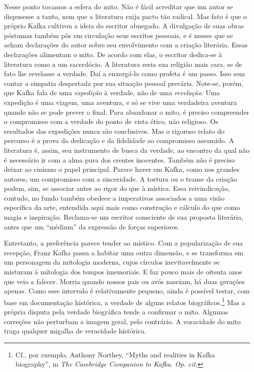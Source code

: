 Nesse ponto tocamos a esfera do mito. Não é fácil acreditar que um autor
se dispusesse a tanto, nem que a literatura exija pacto tão radical.
Mas fato é que o próprio Kafka cultivou a ideia do escritor abnegado. A
divulgação de suas obras póstumas também pôs em circulação seus
escritos pessoais, e é nesses que se acham declarações do autor sobre
seu envolvimento com a criação literária. Essas declarações alimentam o
mito. De acordo com elas, o escritor dedica-se à literatura como a um
sacerdócio. A literatura seria sua religião mais cara, se de fato lhe
revelasse a verdade. Daí a enxergá-lo como profeta é um passo. Isso
sem contar a simpatia despertada por sua situação pessoal precária.
Note-se, porém, que Kafka fala de uma \textit{expedição} à verdade,
não de uma \textit{revelação}. Uma expedição é uma viagem, uma
aventura, e só se vive uma verdadeira aventura quando não se pode
prever o final. Para abandonar o mito, é preciso compreender o
compromisso com a verdade do ponto de vista ético, não religioso. Os
resultados das expedições nunca são conclusivos. Mas o rigoroso relato
do percurso é a prova da dedicação e da fidelidade ao compromisso
assumido. A literatura é, assim, seu instrumento de busca da verdade,
ao encontro da qual não é necessário ir com a alma pura dos crentes
inocentes. Também não é preciso deixar ao cinismo o papel principal.
Parece haver em Kafka, como nos grandes autores, um compromisso com a
sinceridade. A tortura ou o transe da criação podem, sim, se associar antes ao
rigor do que à mística. Essa reivindicação, contudo, no fundo também
obedece a imperativos associados a uma visão específica da arte,
entendida aqui mais como construção e cálculo do que como magia e
inspiração. Reclama-se um escritor consciente de sua proposta
literária, antes que um “médium” da expressão de forças superiores.

Entretanto, a preferência parece tender ao místico. 
Com a popularização de sua recepção, Franz Kafka
passa a habitar uma outra dimensão, e se transforma em um personagem da
mitologia moderna, cujos círculos inevitavelmente se misturam à
mitologia dos tempos imemoriais. E faz pouco mais de oitenta anos que
veio a falecer. Morria quando nossos pais ou avós nasciam, há duas
gerações apenas. Como esse intervalo é relativamente pequeno, ainda é
possível testar, com base em documentação histórica, a verdade de
alguns relatos biográficos.\footnote{ Cf., por exemplo, Anthony
Northey, “Myths and realities in Kafka biography”, in \textit{The
Cambridge Companion to Kafka}. \textit{Op. cit}.} Mas a própria disputa pela verdade biográfica tende a confirmar
o mito. Algumas correções não perturbam a imagem geral, pelo contrário.
A voracidade do mito traga qualquer migalha de veracidade histórica.

